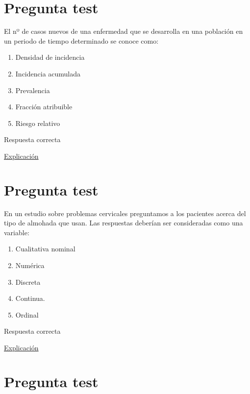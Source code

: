 \documentclass[
]{book}
\providecommand{\tightlist}{%
  \setlength{\itemsep}{0pt}\setlength{\parskip}{0pt}}
\begin{document}
\hypertarget{pregunta-test-7}{%
\section{Pregunta test}\label{pregunta-test-7}}

El nº de casos nuevos de una enfermedad que se desarrolla en una población en un periodo de tiempo determinado se conoce como:

\begin{enumerate}
\def\labelenumi{\alph{enumi})}
\tightlist
\item
  Densidad de incidencia
\item
  Incidencia acumulada
\item
  Prevalencia
\item
  Fracción atribuible
\item
  Riesgo relativo
\end{enumerate}

Respuesta correcta

\href{https://www.conprueba.es/glosario/incidencia-acumulada}{Explicación}

\hypertarget{pregunta-test-8}{%
\section{Pregunta test}\label{pregunta-test-8}}

En un estudio sobre problemas cervicales preguntamos a los pacientes acerca del tipo de almohada que usan. Las respuestas deberían ser consideradas como una variable:

\begin{enumerate}
\def\labelenumi{\alph{enumi})}
\tightlist
\item
  Cualitativa nominal
\item
  Numérica
\item
  Discreta
\item
  Continua.
\item
  Ordinal
\end{enumerate}

Respuesta correcta

\href{https://1fjmanzano.github.io/bioestadistica/tipos-de-variables.html}{Explicación}

\hypertarget{pregunta-test-9}{%
\section{Pregunta test}\label{pregunta-test-9}}
\end{document}
